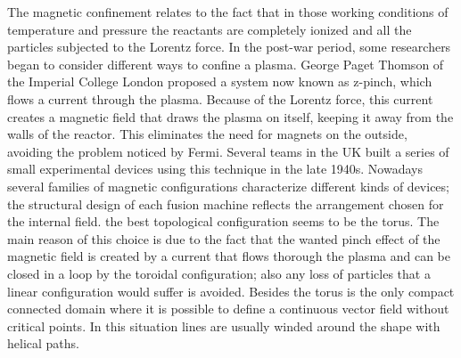 %
The magnetic confinement relates to the fact that in those working conditions of temperature and pressure the reactants are completely ionized and all the particles subjected to the Lorentz force.
%
In the post-war period, some researchers began to consider different ways to confine a plasma. George Paget Thomson of the Imperial College London proposed a system now known as z-pinch, which flows a current through the plasma. Because of the Lorentz force, this current creates a magnetic field that draws the plasma on itself, keeping it away from the walls of the reactor. This eliminates the need for magnets on the outside, avoiding the problem noticed by Fermi. Several teams in the UK built a series of small experimental devices using this technique in the late 1940s.
%
%
%
%
%
%
Nowadays several families of magnetic configurations characterize different kinds of devices; the structural design of each fusion machine reflects the arrangement chosen for the internal field. the best topological configuration seems to be the torus. The main reason of this choice is due to the fact that the wanted pinch effect of the magnetic field is created by a current that flows thorough the plasma and can be closed in a loop by the toroidal configuration; also any loss of particles that a linear configuration would suffer is avoided. Besides the torus is the only compact connected domain where it is possible to define a continuous vector field without critical points. In this situation lines are usually winded around the shape with helical paths. 
%

